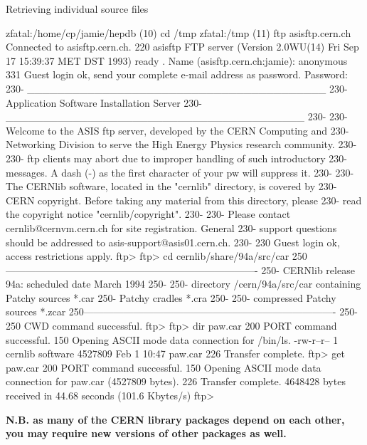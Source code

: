 \begin{XMPt}{Retrieving individual source files}

zfatal:/home/cp/jamie/hepdb (10) cd /tmp
zfatal:/tmp (11) ftp asisftp.cern.ch
Connected to asisftp.cern.ch.
220 asisftp FTP server (Version 2.0WU(14) Fri Sep 17 15:39:37 MET DST 1993) ready
.
Name (asisftp.cern.ch:jamie): anonymous
331 Guest login ok, send your complete e-mail address as password.
Password:
230-                   ________________________________________
230-                   Application Software Installation Server
230-                   ________________________________________
230-
230-   Welcome to the ASIS ftp server, developed by the CERN Computing and
230-   Networking Division to serve the High Energy Physics research community.
230-
230-   ftp clients may abort due to improper handling of such introductory
230-   messages. A dash (-) as the first character of your pw will suppress it.
230-
230-   The CERNlib software, located in the "cernlib" directory, is covered by
230-   CERN copyright. Before taking any material from this directory, please
230-   read the copyright notice "cernlib/copyright".
230-
230-   Please contact cernlib@cernvm.cern.ch for site registration. General
230-   support questions should be addressed to asis-support@asis01.cern.ch. 
230-
230 Guest login ok, access restrictions apply.
ftp> 
ftp> cd cernlib/share/94a/src/car
250----------------------------------------------------------------------------
250-     CERNlib release 94a:    scheduled date      March 1994
250- 
250-     directory /cern/94a/src/car     containing Patchy sources *.car
250-                                                Patchy cradles *.cra
250- 
250-                                     compressed Patchy sources *.zcar
250----------------------------------------------------------------------------
250-
250 CWD command successful.
ftp> 
ftp> dir paw.car
200 PORT command successful.
150 Opening ASCII mode data connection for /bin/ls.
-rw-r--r--   1 cernlib  software  4527809 Feb  1 10:47 paw.car
226 Transfer complete.
ftp> get paw.car
200 PORT command successful.
150 Opening ASCII mode data connection for paw.car (4527809 bytes).
226 Transfer complete.
4648428 bytes received in 44.68 seconds (101.6 Kbytes/s)
ftp> 

\end{XMPt}

{\bf N.B. as many of the CERN library packages depend on each other,
you may require new versions of other packages as well.}

